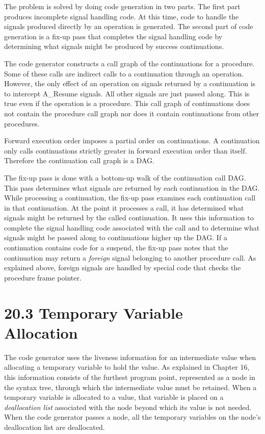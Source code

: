 The problem is solved by doing code generation in two parts. The first
part produces incomplete signal handling code. At this time, code to
handle the signals produced directly by an operation is generated. The
second part of code generation is a fix-up pass that completes the
signal handling code by determining what signals might be produced by
success continuations.

The code generator constructs a call graph of the continuations for a
procedure. Some of these calls are indirect calls to a continuation
through an operation. However, the only effect of an operation on
signals returned by a continuation is to intercept A\_Resume
signals. All other signals are just passed along. This is true even if
the operation is a procedure. This call graph of continuations does
not contain the procedure call graph nor does it contain continuations
from other procedures.

Forward execution order imposes a partial order on continuations. A
continuation only calls continuations strictly greater in forward
execution order than itself. Therefore the continuation call graph is
a DAG.

The fix-up pass is done with a bottom-up walk of the continuation call
DAG. This pass determines what signals are returned by each
continuation in the DAG. While processing a continuation, the fix-up
pass examines each continuation call in that continuation. At the
point it processes a call, it has determined what signals might be
returned by the called continuation. It uses this information to
complete the signal handling code associated with the call and to
determine what signals might be passed along to continuations higher
up the DAG. If a continuation contains code for a suspend, the fix-up
pass notes that the continuation may return a \textit{foreign} signal
belonging to another procedure call. As explained above, foreign
signals are handled by special code that checks the procedure frame
pointer.


\section[20.3 Temporary Variable Allocation]{20.3 Temporary Variable Allocation}

The code generator uses the liveness information for an intermediate
value when allocating a temporary variable to hold the value. As
explained in Chapter 16, this information consists of the furthest
program point, represented as a node in the syntax tree, through which
the intermediate value must be retained. When a temporary variable is
allocated to a value, that variable is placed on a
\textit{deallocation list} associated with the node beyond which its
value is not needed. When the code generator passes a node, all the
temporary variables on the node's deallocation list are deallocated.

